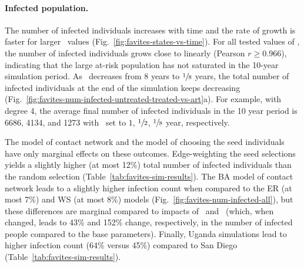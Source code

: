 \paragraph{Infected population.} The number of infected individuals increases with time and the rate of growth is faster for larger \EART\ values (Fig.~\ref{fig:favites-states-vs-time}). For all tested values of \EART, the number of infected individuals grows close to linearly (Pearson $r\ge 0.966$), indicating that the large at-risk population has not saturated in the 10-year simulation period.  As \EART\ decreases from 8 years to $\sfrac{1}{8}$ years, the total number of infected individuals at the end of the simulation keeps decreasing (Fig.~\ref{fig:favites-num-infected-untreated-treated-vs-art}a). For example, with degree 4, the average final number of infected individuals in the 10 year period is 6686, 4134, and 1273 with \EART\ set to $1$, $\sfrac{1}{2}$, $\sfrac{1}{8}$ year, respectively.

The model of contact network and the model of choosing the seed individuals have only marginal effects on these outcomes. Edge-weighting the seed selections yields a slightly higher (at most 12\%) total number of infected individuals than the random selection (Table~\ref{tab:favites-sim-results}). The \gls{BA} model of contact network leads to a slightly higher infection count when compared to the \gls{ER} (at most 7\%) and \gls{WS}  (at most 8\%) models (Fig.~\ref{fig:favites-num-infected-all}), but these differences are marginal compared to impacts of \EART\ and \ED\ (which, when changed, leads to  43\% and 152\% change, respectively, in the number of infected people compared to the base parameters). Finally, Uganda simulations lead to higher infection count (64\% versus 45\%) compared to San Diego (Table~\ref{tab:favites-sim-results}).


